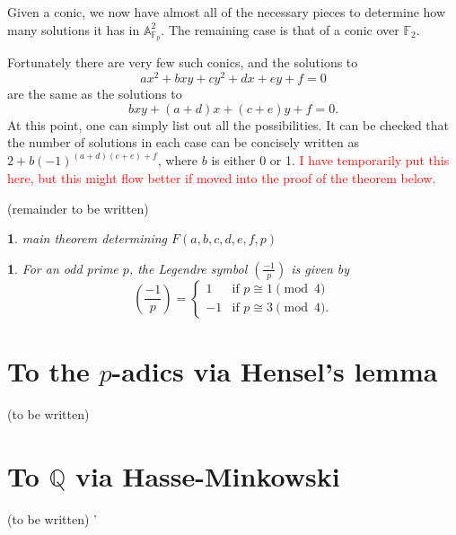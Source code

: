 \documentclass[10pt,a4paper]{amsart}
\numberwithin{equation}{section}
\numberwithin{figure}{section}
\theoremstyle{definition}
\theoremstyle{remark}
\theoremstyle{plain}
\newtheorem{thm}{\protect\theoremname}[section]
\theoremstyle{plain}
\theoremstyle{definition}
\theoremstyle{plain}
\newtheorem{prop}{\protect\propositionname}[section]
\theoremstyle{plain}
\providecommand{\propositionname}{Proposition}
\providecommand{\theoremname}{Theorem}
\newcommand{\legendre}[2]{\genfrac{(}{)}{}{}{#1}{#2}}
\newcommand{\A}{\mathbb{A}}
\newcommand{\F}{\mathbb{F}}
\begin{document}
    Given a conic, we now have almost all of the necessary pieces to determine how
    many solutions it has in $\A^2_{\F_p}$. The remaining case is that of a
    conic over $\F_2$.

    Fortunately there are very few such conics, and the solutions to 
    \[ ax^2 + bxy + cy^2 + dx + ey + f = 0 \] 
    are the same as the solutions to 
    \[ bxy + (a+d)x + (c+e)y + f = 0.  \] 
    At this point, one can simply list out all the
    possibilities. It can be checked that the number of solutions in each case can
    be concisely written as $2 + b(-1)^{(a+d)(c+e) + f}$, where $b$ is either 0 or
    1. \textcolor{red}{I have temporarily put this here, but this might flow better
    if moved into the proof of the theorem below. }

    (remainder to be written)

    \begin{thm} 
        main theorem determining $F(a,b,c,d,e,f,p)$ 
    \end{thm}

    \begin{prop} 
        For an odd prime $p$, the Legendre symbol $\legendre{-1}{p}$ is
        given by 
        \[ \legendre{-1}{p} = \begin{cases} 
            1 & \text{if } p \cong 1 \pmod 4 \\ 
            -1 & \text{if } p \cong 3 \pmod 4.  
        \end{cases} \]
    \end{prop}

    \section{To the $p$-adics via Hensel's lemma} (to be written)

    \section{To $\mathbb{Q}$ via Hasse-Minkowski} (to be written) '
\end{document}
